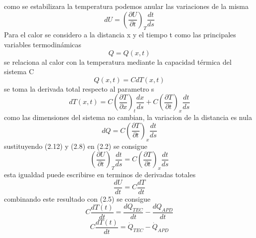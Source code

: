 como se estabilizara la temperatura podemos anular las variaciones de la misma 
\begin{equation}
    dU = (\frac{\partial U}{\partial t})_{T}\frac{dt}{ds}
\end{equation}
Para el calor se considero a la distancia x y el tiempo t como las principales variables termodinámicas 
\begin{equation}
    Q = Q(x,t)
\end{equation}
se relaciona al calor con la temperatura mediante la capacidad térmica del sistema C
\begin{equation}
    Q(x,t)=CdT(x,t)
\end{equation}
se toma la derivada total respecto al parametro s 
\begin{equation}
    dT(x,t) = C(\frac{\partial T}{\partial x})_{t}\frac{dx}{ds} + C(\frac{\partial T}{\partial t})_{x}\frac{dt}{ds}
\end{equation}
como las dimensiones del sistema no cambian, la variacion de la distancia es nula 
\begin{equation}
    dQ = C(\frac{\partial T}{\partial t})_{x}\frac{dt}{ds}
\end{equation}
sustituyendo (2.12) y (2.8) en (2.2) se consigue
\begin{equation}
     (\frac{\partial U}{\partial t})_{T}\frac{dt}{ds} =
     C(\frac{\partial T}{\partial t})_{x}\frac{dt}{ds}
\end{equation}
esta igualdad puede escribirse en terminos de derivadas totales 
\begin{equation}
    \frac{dU}{dt} = C\frac{dT}{dt}
\end{equation}
combinando este resultado con (2.5) se consigue
\begin{equation}
    C\frac{dT(t)}{dt} = \frac{dQ_{TEC}}{dt}-\frac{dQ_{APD}}{dt}
\end{equation}
\begin{equation}
    C\frac{dT(t)}{dt} = \dot{Q}_{TEC}-\dot{Q}_{APD}
\end{equation}
